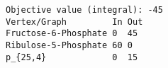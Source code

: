 \begin{verbatim}
Objective value (integral): -45
Vertex/Graph         In Out 
Fructose-6-Phosphate 0  45  
Ribulose-5-Phosphate 60 0   
p_{25,4}             0  15  
\end{verbatim}
